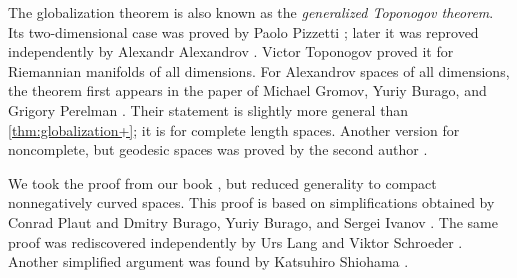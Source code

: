The globalization theorem is also known as the \textit{generalized Toponogov theorem}.
Its two-dimensional case was proved by Paolo Pizzetti \cite{pizzetti};
later it was reproved independently by Alexandr Alexandrov \cite{alexandrov:devel}. %
Victor Toponogov \cite{toponogov-globalization+splitting} proved it for Riemannian manifolds of all dimensions.
For Alexandrov spaces of all dimensions, the theorem first appears in the paper of Michael Gromov, Yuriy Burago, and Grigory Perelman \cite{burago-gromov-perelman}.
Their statement is slightly more general than \ref{thm:globalization+}; it is for complete length spaces.
Another version for noncomplete, but geodesic spaces was proved by the second author \cite{petrunin:globalization}.


We took the proof from our book \cite{alexander-kapovitch-petrunin2024}, but reduced generality to compact nonnegatively curved spaces.
This proof is based on simplifications obtained by Conrad Plaut \cite{plaut:dimension} and Dmitry Burago, Yuriy Burago, and Sergei Ivanov \cite{burago-burago-ivanov}.
The same proof was rediscovered independently by Urs Lang and Viktor Schroeder \cite{lang-schroeder:globalization}.
Another simplified argument was found by Katsuhiro Shiohama \cite{shiohama}.




